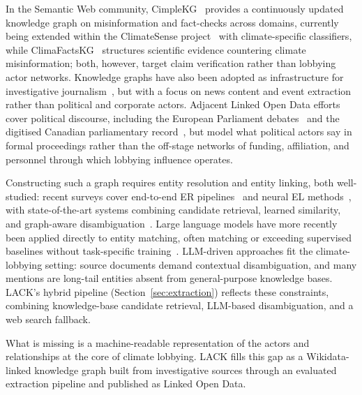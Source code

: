 In the Semantic Web community, CimpleKG~\cite{burel2024cimplekg} provides a continuously updated knowledge graph on misinformation and fact-checks across domains, currently being extended within the ClimateSense project~\cite{climatesense} with climate-specific classifiers, while ClimaFactsKG~\cite{burel2025climafactskg} structures scientific evidence countering climate misinformation; both, however, target claim verification rather than lobbying actor networks.
Knowledge graphs have also been adopted as infrastructure for investigative journalism~\cite{opdahl2022semantic,gallofre2022jkp,berven2020kg,alexander2023manifesto,motta2025epistemology}, but with a focus on news content and event extraction rather than political and corporate actors.
Adjacent Linked Open Data efforts cover political discourse, including the European Parliament debates~\cite{van2016debates} and the digitised Canadian parliamentary record~\cite{beelen2017digitization}, but model what political actors say in formal proceedings rather than the off-stage networks of funding, affiliation, and personnel through which lobbying influence operates.

Constructing such a graph requires entity resolution and entity linking, both well-studied: recent surveys cover end-to-end ER pipelines~\cite{christophides2020er} and neural EL methods~\cite{sevgili2022neural}, with state-of-the-art systems combining candidate retrieval, learned similarity, and graph-aware disambiguation~\cite{ayoola2022refined}.
Large language models have more recently been applied directly to entity matching, often matching or exceeding supervised baselines without task-specific training~\cite{peeters2025llmem}.
LLM-driven approaches fit the climate-lobbying setting: source documents demand contextual disambiguation, and many mentions are long-tail entities absent from general-purpose knowledge bases.
LACK's hybrid pipeline (Section~\ref{sec:extraction}) reflects these constraints, combining knowledge-base candidate retrieval, LLM-based disambiguation, and a web search fallback.

What is missing is a machine-readable representation of the actors and relationships at the core of climate lobbying.
LACK fills this gap as a Wikidata-linked knowledge graph built from investigative sources through an evaluated extraction pipeline and published as Linked Open Data.